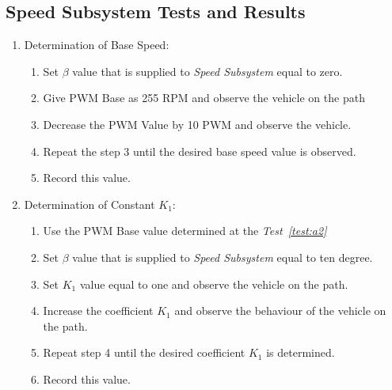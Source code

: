 \documentclass[a4paper,12pt]{article}
\begin{document}


\subsection {Speed Subsystem Tests and Results}

\begin{enumerate}

\item Determination of Base Speed: \label{test:a2}	

\begin{enumerate}

\item Set $\beta$ value that is supplied to \textit{Speed Subsystem} equal to zero.

\item Give PWM Base as 255 RPM and observe the vehicle on the path 

\item Decrease the PWM Value by 10 PWM and observe the vehicle.

\item Repeat the step 3 until the desired base speed value is observed.

\item Record this value.

\end{enumerate}


\item Determination of Constant $K_1$:

\begin{enumerate}

\item Use the PWM Base value determined at the \textit{Test~\ref{test:a2}}

\item Set $\beta$ value that is supplied to \textit{Speed Subsystem} equal to ten degree.

\item Set $K_1$ value equal to one and observe the vehicle on the path.

\item Increase the coefficient $K_1$ and observe the behaviour of the vehicle on the path.

\item Repeat step 4 until the desired coefficient $K_1$ is determined.

\item Record this value.

\end{enumerate}





\end{enumerate}
\end{document}
